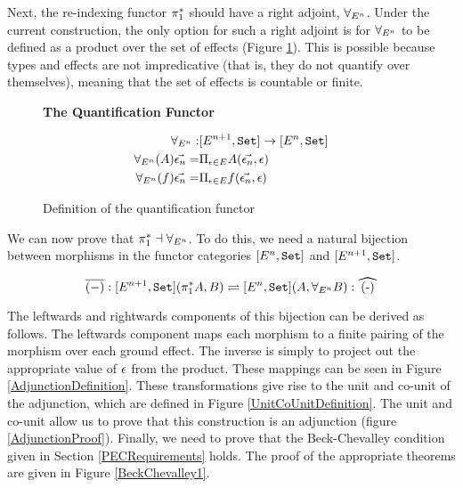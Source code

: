 \documentclass{Report}
\begin{document}
Next, the re-indexing functor $\pi_1^*$ should have a right adjoint, $\forall_{E^n}$. Under the current construction, the only option for such a right adjoint is for $\forall_{E^n}$ to be defined as a product over the set of effects (Figure \ref{ProductQuantification}). This is possible because types and effects are not impredicative (that is, they do not quantify over themselves), meaning that the set of effects is countable or finite.

\begin{figure}
    \begin{framed}
        \centering
        \textbf{The Quantification Functor}

        \begin{align*}
            \forall_{E^n}:& [E^{n+1}, \texttt{Set}] \rightarrow [E^n, \texttt{Set}]\\
            \forall_{E^n}(A)\vec{\epsilon_n} =&\Pi_{\epsilon\in E}{A(\vec{\epsilon_n}, \epsilon)}
            \\ 
            \forall_{E^n}(f)\vec{\epsilon_n} =&\Pi_{\epsilon\in E}{f(\vec{\epsilon_n}, \epsilon)}
        \end{align*}
        
    \end{framed}
    \caption{Definition of the quantification functor}
    \label{ProductQuantification}
\end{figure}



We can now prove that $\pi_1^* \dashv \forall_{E^n}$. To do this, we need a natural bijection between morphisms in the functor categories $[E^n, \texttt{Set}]$ and $[E^{n+1}, \texttt{Set}]$.

\begin{equation}
    \bar{(-)}: [E^{n+1}, \set](\pstar A, B) \rightleftharpoons [E^n,\set] (A, \allEn B): \widehat{(-)}
\end{equation}

The leftwards and rightwards components of this bijection can be derived as follows. The leftwards component maps each morphism to a finite pairing of the morphism over each ground effect. The inverse is simply to project out the appropriate value of $\epsilon$ from the product. These mappings can be seen in Figure \ref{AdjunctionDefinition}. These transformations give rise to the unit and co-unit of the adjunction, which are defined in Figure \ref{UnitCoUnitDefinition}. The unit and co-unit allow us to prove that this construction is an adjunction (figure \ref{AdjunctionProof}).  Finally, we need to prove that the Beck-Chevalley condition given in Section \ref{PECRequirements} holds. The proof of the appropriate theorems are given in Figure \ref{BeckChevalley1}.
\end{document}
